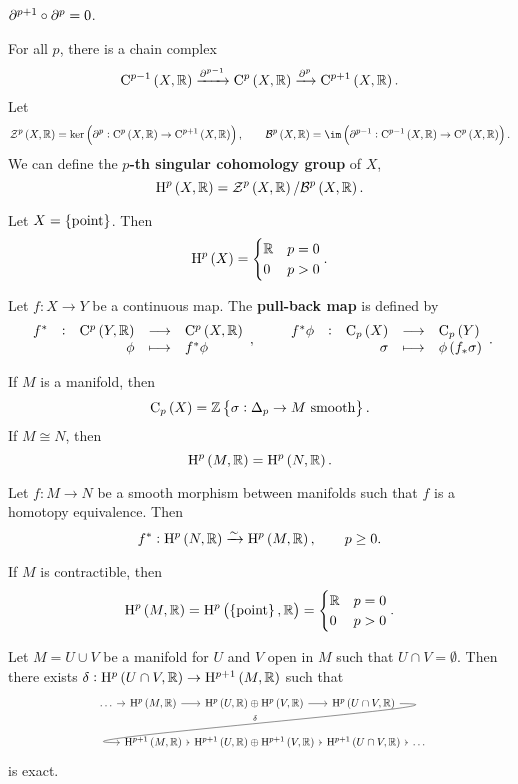 \begin{exercise*}
$ \partial^{p + 1} \circ \partial^p = 0 $.
\end{exercise*}

For all $ p $, there is a chain complex
$$ \C^{p - 1}\br{X, \RR} \xrightarrow{\da^{p - 1}} \C^p\br{X, \RR} \xrightarrow{\da^p} \C^{p + 1}\br{X, \RR}. $$
Let
$$ \ZZZ^p\br{X, \RR} = \ker \br{\da^p : \C^p\br{X, \RR} \to \C^{p + 1}\br{X, \RR}}, \qquad \BBB^p\br{X, \RR} = \im \br{\da^{p - 1} : \C^{p - 1}\br{X, \RR} \to \C^p\br{X, \RR}}. $$
We can define the \textbf{$ p $-th singular cohomology group} of $ X $,
$$ \H^p\br{X, \RR} = \ZZZ^p\br{X, \RR} / \BBB^p\br{X, \RR}. $$

\begin{exercise*}
Let $ X = \cbr{\text{point}} $. Then
$$ \H^p\br{X} =
\begin{cases}
\RR & p = 0 \\
0 & p > 0
\end{cases}.
$$
\end{exercise*}

\pagebreak

Let $ f : X \to Y $ be a continuous map. The \textbf{pull-back map} is defined by
$$ \function[f^*]{\C^p\br{Y, \RR}}{\C^p\br{X, \RR}}{\phi}{f^*\phi}, \qquad \function[f^*\phi]{\C_p\br{X}}{\C_p\br{Y}}{\sigma}{\phi\br{f_*\sigma}}. $$


If $ M $ is a manifold, then
$$ \C_p\br{X} = \ZZ\cbr{\sigma : \Delta_p \to M \ \text{smooth}}. $$
If $ M \cong N $, then
$$ \H^p\br{M, \RR} = \H^p\br{N, \RR}. $$

\begin{theorem}
Let $ f : M \to N $ be a smooth morphism between manifolds such that $ f $ is a homotopy equivalence. Then
$$ f^* : \H^p\br{N, \RR} \xrightarrow{\sim} \H^p\br{M, \RR}, \qquad p \ge 0. $$
\end{theorem}

\begin{example*}
If $ M $ is contractible, then
$$ \H^p\br{M, \RR} = \H^p\br{\cbr{\text{point}}, \RR} =
\begin{cases}
\RR & p = 0 \\
0 & p > 0
\end{cases}.
$$
\end{example*}

\begin{theorem}
Let $ M = U \cup V $ be a manifold for $ U $ and $ V $ open in $ M $ such that $ U \cap V = \emptyset $. Then there exists $ \delta : \H^p\br{U \cap V, \RR} \to \H^{p + 1}\br{M, \RR} $ such that
$$
\begin{tikzcd}[column sep=0.1cm]
\dots \arrow{r} & \H^p\br{M, \RR} \arrow{r} & \H^p\br{U, \RR} \oplus \H^p\br{V, \RR} \arrow{r} & \H^p\br{U \cap V, \RR} \arrow[in=180, out=0]{dll}[swap]{\delta} & \\
& \H^{p + 1}\br{M, \RR} \arrow{r} & \H^{p + 1}\br{U, \RR} \oplus \H^{p + 1}\br{V, \RR} \arrow{r} & \H^{p + 1}\br{U \cap V, \RR} \arrow{r} & \dots
\end{tikzcd}
$$
is exact.
\end{theorem}


